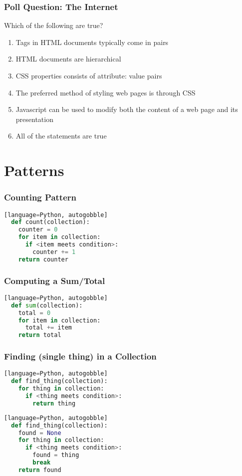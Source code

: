 \documentclass{beamer}
\begin{document}
%
%
\begin{frame}[fragile]
  \frametitle{Poll Question: The Internet}
  Which of the following are true?
  \vfill
  \begin{enumerate}[A]
    \item Tags in HTML documents typically come in pairs
    \item HTML documents are hierarchical
    \item CSS properties consists of attribute: value pairs
    \item The preferred method of styling web pages is through CSS
    \item Javascript can be used to modify both the content of a web page and its presentation
    \item All of the statements are true
  \end{enumerate}
\end{frame}

\section{Patterns}

%
%
\begin{frame}[fragile]
  \frametitle{Counting Pattern}
  \begin{lstlisting}[language=Python, autogobble][language=Python, autogobble]
  def count(collection):
    counter = 0
    for item in collection:
      if <item meets condition>:
        counter += 1
    return counter
  \end{lstlisting}
\end{frame}

%
%
\begin{frame}[fragile]
  \frametitle{Computing a Sum/Total}
  \begin{lstlisting}[language=Python, autogobble][language=Python, autogobble]
  def sum(collection):
    total = 0
    for item in collection:
      total += item
    return total
  \end{lstlisting}
\end{frame}

%
%
\begin{frame}[fragile]
  \frametitle{Finding (single thing) in a Collection}
  \begin{lstlisting}[language=Python, autogobble][language=Python, autogobble]
  def find_thing(collection):
    for thing in collection:
      if <thing meets condition>:
        return thing
  \end{lstlisting}
  \vfill
  \begin{lstlisting}[language=Python, autogobble][language=Python, autogobble]
  def find_thing(collection):
    found = None
    for thing in collection:
      if <thing meets condition>:
        found = thing
        break
    return found
  \end{lstlisting}
\end{frame}
\end{document}
